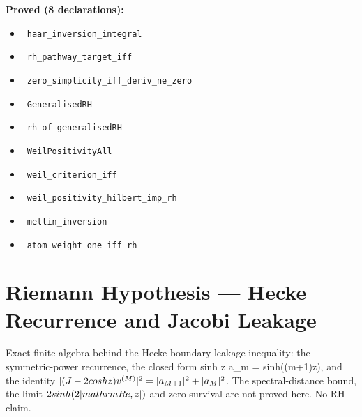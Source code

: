 \documentclass{report}
\theoremstyle{definition}
\begin{document}
\noindent\textbf{Proved (8 declarations):}
\begin{itemize}
  \item {}\leanok\ \texttt{haar\_inversion\_integral}
  \item {}\leanok\ \texttt{rh\_pathway\_target\_iff}
  \item {}\leanok\ \texttt{zero\_simplicity\_iff\_deriv\_ne\_zero}
  \item {}\leanok\ \texttt{GeneralisedRH}
  \item {}\leanok\ \texttt{rh\_of\_generalisedRH}
  \item {}\leanok\ \texttt{WeilPositivityAll}
  \item {}\leanok\ \texttt{weil\_criterion\_iff}
  \item {}\leanok\ \texttt{weil\_positivity\_hilbert\_imp\_rh}
  \item {}\leanok\ \texttt{mellin\_inversion}
  \item {}\leanok\ \texttt{atom\_weight\_one\_iff\_rh}
\end{itemize}

\section{Riemann Hypothesis --- Hecke Recurrence and Jacobi Leakage}
Exact finite algebra behind the Hecke-boundary leakage inequality: the symmetric-power recurrence, the closed form sinh z a_m = sinh((m+1)z), and the identity $\\|(J-2\\cosh z)v^{(M)}\\|^2=|a_{M+1}|^2+|a_M|^2$. The spectral-distance bound, the limit $2\\sinh(2|\\mathrm{Re}\\,z|)$ and zero survival are not proved here. No RH claim.
\end{document}
